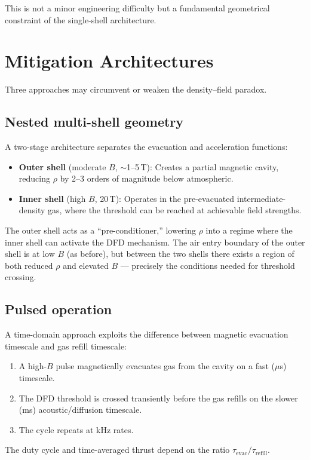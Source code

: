\documentclass[12pt,twocolumn]{article}
\begin{document}
This is not a minor engineering difficulty but a fundamental
geometrical constraint of the single-shell architecture.

\section{Mitigation Architectures}
\label{sec:mitigations}

Three approaches may circumvent or weaken the density--field paradox.

\subsection{Nested multi-shell geometry}

A two-stage architecture separates the evacuation and acceleration
functions:
\begin{itemize}[nosep]
  \item \textbf{Outer shell} (moderate $B$, $\sim$1--5\,T): Creates
        a partial magnetic cavity, reducing $\rho$ by 2--3 orders of
        magnitude below atmospheric.
  \item \textbf{Inner shell} (high $B$, 20\,T): Operates in the
        pre-evacuated intermediate-density gas, where the threshold
        can be reached at achievable field strengths.
\end{itemize}
The outer shell acts as a ``pre-conditioner,'' lowering $\rho$ into a
regime where the inner shell can activate the DFD mechanism. The air
entry boundary of the outer shell is at low $B$ (as before), but
between the two shells there exists a region of both reduced $\rho$
and elevated $B$ --- precisely the conditions needed for threshold
crossing.

\subsection{Pulsed operation}

A time-domain approach exploits the difference between magnetic
evacuation timescale and gas refill timescale:
\begin{enumerate}[nosep]
  \item A high-$B$ pulse magnetically evacuates gas from the cavity
        on a fast ($\mu$s) timescale.
  \item The DFD threshold is crossed transiently before the gas
        refills on the slower (ms) acoustic/diffusion timescale.
  \item The cycle repeats at kHz rates.
\end{enumerate}
The duty cycle and time-averaged thrust depend on the ratio
$\tau_\mathrm{evac}/\tau_\mathrm{refill}$.
\end{document}
